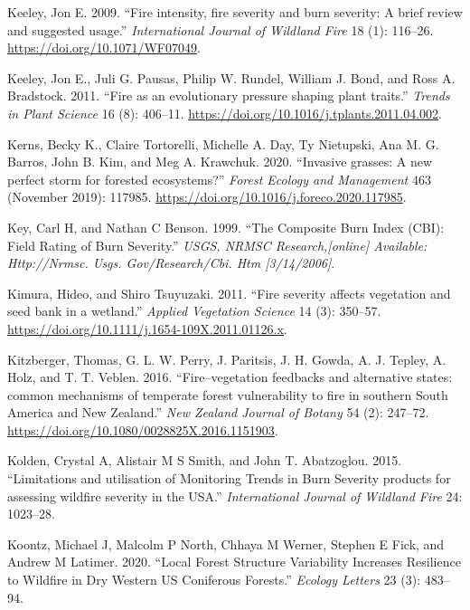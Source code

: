 \documentclass[
  12pt,
]{article}
\newlength{\cslhangindent}
\newlength{\cslentryspacingunit} %
\newenvironment{CSLReferences}[2] %
 {%
  \setlength{\parindent}{0pt}
  \ifodd #1
  \let\oldpar\par
  \def\par{\hangindent=\cslhangindent\oldpar}
  \fi
  \setlength{\parskip}{#2\cslentryspacingunit}
 }%
 {}
\begin{document}
\begin{CSLReferences}{1}{0}
\leavevmode{}%
Keeley, Jon E. 2009. {``{Fire intensity, fire severity and burn
severity: A brief review and suggested usage}.''} \emph{International
Journal of Wildland Fire} 18 (1): 116--26.
\url{https://doi.org/10.1071/WF07049}.

\leavevmode{}%
Keeley, Jon E., Juli G. Pausas, Philip W. Rundel, William J. Bond, and
Ross A. Bradstock. 2011. {``{Fire as an evolutionary pressure shaping
plant traits}.''} \emph{Trends in Plant Science} 16 (8): 406--11.
\url{https://doi.org/10.1016/j.tplants.2011.04.002}.

\leavevmode{}%
Kerns, Becky K., Claire Tortorelli, Michelle A. Day, Ty Nietupski, Ana
M. G. Barros, John B. Kim, and Meg A. Krawchuk. 2020. {``{Invasive
grasses: A new perfect storm for forested ecosystems?}''} \emph{Forest
Ecology and Management} 463 (November 2019): 117985.
\url{https://doi.org/10.1016/j.foreco.2020.117985}.

\leavevmode{}%
Key, Carl H, and Nathan C Benson. 1999. {``The Composite Burn Index
(CBI): Field Rating of Burn Severity.''} \emph{USGS, NRMSC
Research,{[}online{]} Available: Http://Nrmsc. Usgs. Gov/Research/Cbi.
Htm {[}3/14/2006{]}}.

\leavevmode{}%
Kimura, Hideo, and Shiro Tsuyuzaki. 2011. {``{Fire severity affects
vegetation and seed bank in a wetland}.''} \emph{Applied Vegetation
Science} 14 (3): 350--57.
\url{https://doi.org/10.1111/j.1654-109X.2011.01126.x}.

\leavevmode{}%
Kitzberger, Thomas, G. L. W. Perry, J. Paritsis, J. H. Gowda, A. J.
Tepley, A. Holz, and T. T. Veblen. 2016. {``{Fire--vegetation feedbacks
and alternative states: common mechanisms of temperate forest
vulnerability to fire in southern South America and New Zealand}.''}
\emph{New Zealand Journal of Botany} 54 (2): 247--72.
\url{https://doi.org/10.1080/0028825X.2016.1151903}.

\leavevmode{}%
Kolden, Crystal A, Alistair M S Smith, and John T. Abatzoglou. 2015.
{``{Limitations and utilisation of Monitoring Trends in Burn Severity
products for assessing wildfire severity in the USA}.''}
\emph{International Journal of Wildland Fire} 24: 1023--28.

\leavevmode{}%
Koontz, Michael J, Malcolm P North, Chhaya M Werner, Stephen E Fick, and
Andrew M Latimer. 2020. {``Local Forest Structure Variability Increases
Resilience to Wildfire in Dry Western US Coniferous Forests.''}
\emph{Ecology Letters} 23 (3): 483--94.


\end{CSLReferences}
\end{document}
